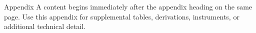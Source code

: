 Appendix A content begins immediately after the appendix heading on the same page.
Use this appendix for supplemental tables, derivations, instruments, or additional
technical detail.
